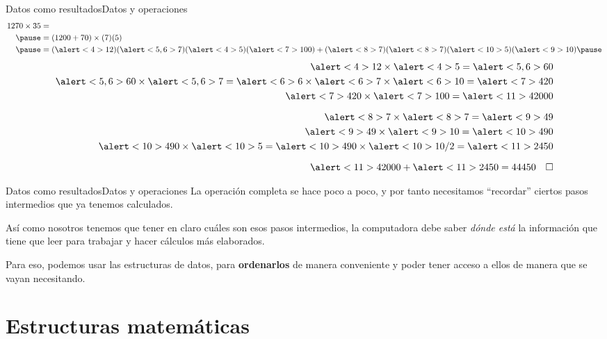 \documentclass[spanish, c]{beamer}
\begin{document}
\begin{frame}{Datos como resultados}{Datos y operaciones}
    \begin{align*}
        1270 \times 35 & = \\ \pause
        & = (1200 + 70) \times (7)(5) \\ \pause
        & = (\alert<4>{12})(\alert<5,6>{7})(\alert<4>{5})(\alert<7>{100}) + (\alert<8>{7})(\alert<8>{7})(\alert<10>{5})(\alert<9>{10}) \pause
    \end{align*}
    \vspace{-2ex}
    \begin{align*}
        \alert<4>{12} \times \alert<4>{5} = \alert<5,6>{60} \\
        \alert<5,6>{60} \times \alert<5,6>{7} = \alert<6>{6} \times \alert<6>{7} \times \alert<6>{10} = \alert<7>{420} \\
        \alert<7>{420} \times \alert<7>{100} = \alert<11>{42000} \\[1.5ex]
        \alert<8>{7} \times \alert<8>{7} = \alert<9>{49} \\
        \alert<9>{49} \times \alert<9>{10} = \alert<10>{490} \\
        \alert<10>{490} \times \alert<10>{5} = \alert<10>{490} \times \alert<10>{10 / 2} = \alert<11>{2450}\\[1.5ex]
        \alert<11>{42000} + \alert<11>{2450} = 44450 \quad \square
    \end{align*}
\end{frame}

\begin{frame}{Datos como resultados}{Datos y operaciones}    
    La operación completa se hace poco a poco, y por tanto necesitamos ``recordar'' ciertos pasos intermedios que ya tenemos calculados. \pause

    \bigskip
    
    Así como nosotros tenemos que tener en claro cuáles son esos pasos intermedios, la computadora debe saber \textit{dónde está} la información que tiene que leer para trabajar y hacer cálculos más elaborados. \pause

    \bigskip

    Para eso, podemos usar las estructuras de datos, para \textbf{ordenarlos} de manera conveniente y poder tener acceso a ellos de manera que se vayan necesitando.

\end{frame}

\section{Estructuras matemáticas}
\end{document}

